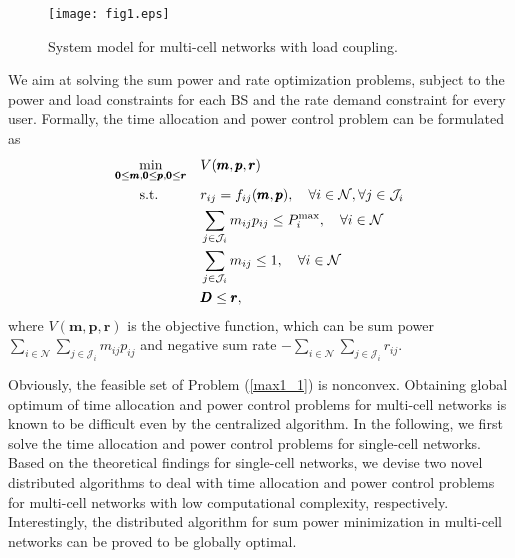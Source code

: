 \documentclass[journal]{IEEEtran}
\begin{document}
\begin{figure}
\centering
\texttt{[image: fig1.eps]}
\vspace{-1em}
\caption{System model for multi-cell networks with load coupling.  \label{fig0}}
\vspace{-1em}
\end{figure}

We aim at solving the sum power and rate optimization problems, subject to the power and load constraints for each BS and the rate demand constraint for every user.
Formally, the time allocation and power control problem can be formulated as
\begin{subequations}\label{max1_1}
\begin{align}
\mathop{\min}_{
\pmb{0} \leq \pmb{m}, \pmb{0}\leq \pmb{p}, \pmb 0 \leq \pmb{r}} \quad
&V(\pmb m, \pmb p, \pmb r)
\\
\textrm{s.t.}\qquad\quad
&r_{ij}=f_{ij}(\pmb{m},\pmb{p}), \quad\forall i  \in {\cal{N}}, \forall j \in {\cal{J}}_i\\
&\sum_{j \in {\cal{J}}_i }m_{ij} p_{ij} \leq P_i^{\max}, \quad\forall i  \in {\cal{N}}\\
&\sum_{j \in {\cal{J}}_i }m_{ij} \leq 1, \quad  \forall i  \in {\cal{N}}\\
&\pmb D  \leq  \pmb r,
\end{align}
\end{subequations}
where $V(\pmb m, \pmb p, \pmb r)$ is the objective function, which can be sum power $\sum_{i \in \mathcal N} \sum_{j\in\mathcal J_i} m_{ij}p_{ij}$ and negative sum rate $-\sum_{i \in \mathcal N} \sum_{j\in\mathcal J_i} r_{ij}$.

Obviously, the feasible set of Problem (\ref{max1_1}) is nonconvex.
Obtaining global optimum of time allocation and power control problems for multi-cell networks is known to be difficult even by the centralized algorithm.
In the following, we first solve the time allocation and power control problems for single-cell networks.
Based on the theoretical findings for single-cell networks,
we devise two novel distributed algorithms to deal with time allocation and power control problems for multi-cell networks with low computational complexity, respectively.
Interestingly, the distributed algorithm for sum power minimization in multi-cell networks can be proved to be globally optimal. %
\end{document}

